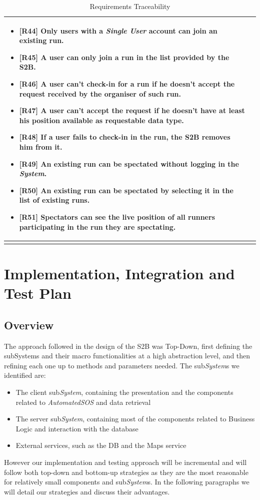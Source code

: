 \documentclass[titlepage]{article}
\begin{document}
\begin{longtable}{| p{5 cm} | p{8 cm} |}
\begin{itemize}
			\item {\bf [R44]} Only users with a {\it Single User} account can join an existing run.
			\item {\bf [R45]} A user can only join a run in the list provided by the S2B.
			\item {\bf [R46]} A user can’t check-in for a run if he doesn’t accept the request received by the organiser of such run.
			\item {\bf [R47]} A user can’t accept the request if he doesn’t have at least his position available as requestable data type.
			\item {\bf [R48]} If a user fails to check-in in the run, the S2B removes him from it.
			\item {\bf [R49]} An existing run can be spectated without logging in the {\it System}.
			\item {\bf [R50]} An existing run can be spectated by selecting it in the list of existing runs.
			\item {\bf [R51]} Spectators can see the live position of all runners participating in the run they are spectating.
		\end{itemize}		
		\\	 \hline		
		\caption{Requirements Traceability}	
						
	\end{longtable}

\pagebreak

\section{Implementation, Integration and Test Plan}
\subsection{Overview}
The approach followed in the design of the S2B was Top-Down, first defining the subSystems and their macro functionalities at a high abstraction level, and then refining each one up to methods and parameters needed. 
The sub{\it System}s we identified are:
\begin{itemize}
    \item The client sub{\it System}, containing the presentation and the components related to {\it AutomatedSOS} and data retrieval
    \item The server sub{\it System}, containing most of the components related to Business Logic and interaction with the database
    \item External services, such as the DB and the Maps service
\end{itemize}
However our implementation and testing approach will be incremental and will follow both top-down and bottom-up strategies as they are the most reasonable for relatively small components and sub{\it System}s. In the following paragraphs we will detail our strategies and discuss their advantages. 
\end{document}
